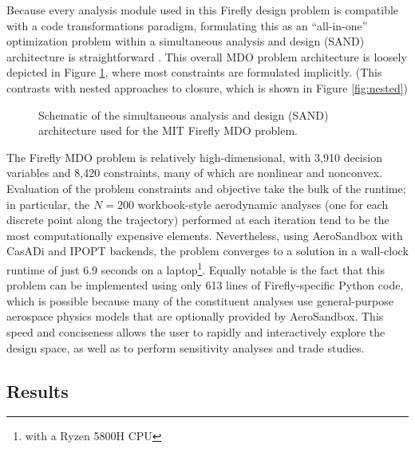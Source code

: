 \begin{example}
\begin{itemize}
    \end{itemize}

\end{example}

Because every analysis module used in this Firefly design problem is compatible with a code transformations paradigm, formulating this as an ``all-in-one'' optimization problem within a simultaneous analysis and design (SAND) architecture is straightforward \cite{haftka_simultaneous_1985, martins_multidisciplinary_2013}. This overall MDO problem architecture is loosely depicted in Figure \ref{fig:sand}, where most constraints are formulated implicitly. (This contrasts with nested approaches to closure, which is shown in Figure \ref{fig:nested})

\begin{figure}[h]
    \centering
    
    \caption{Schematic of the simultaneous analysis and design (SAND) architecture used for the MIT Firefly MDO problem.}
    \label{fig:sand}
\end{figure}

The Firefly MDO problem is relatively high-dimensional, with 3,910 decision variables and 8,420 constraints, many of which are nonlinear and nonconvex. Evaluation of the problem constraints and objective take the bulk of the runtime; in particular, the $N=200$ workbook-style aerodynamic analyses (one for each discrete point along the trajectory) performed at each iteration tend to be the most computationally expensive elements. Nevertheless, using AeroSandbox with CasADi and IPOPT backends, the problem converges to a solution in a wall-clock runtime of just 6.9 seconds on a laptop\footnote{with a Ryzen 5800H CPU}. Equally notable is the fact that this problem can be implemented using only 613 lines of Firefly-specific Python code, which is possible because many of the constituent analyses use general-purpose aerospace physics models that are optionally provided by AeroSandbox. This speed and conciseness allows the user to rapidly and interactively explore the design space, as well as to perform sensitivity analyses and trade studies.

\subsection{Results}

